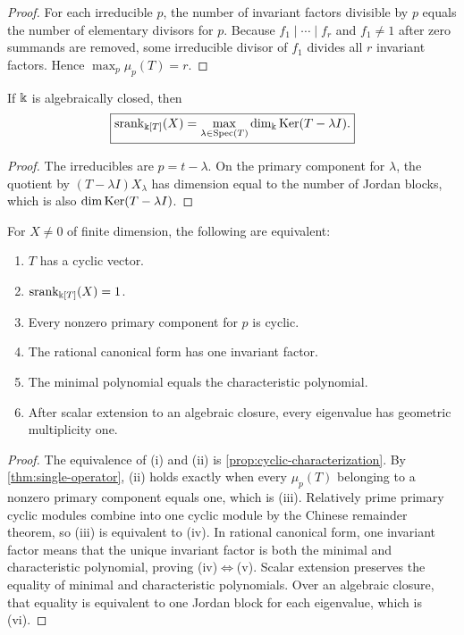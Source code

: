 \begin{proof}
For each irreducible $p$, the number of invariant factors divisible by $p$ equals the number of elementary divisors for $p$.  Because $f_1\mid\cdots\mid f_r$ and $f_1\neq1$ after zero summands are removed, some irreducible divisor of $f_1$ divides all $r$ invariant factors.  Hence $\max_p\mu_p(T)=r$.
\end{proof}

\begin{corollary}
\label{cor:geometric-multiplicity}
If $\Bbbk$ is algebraically closed, then
\[
\boxed{
\operatorname{srank}_{\Bbbk[T]}(X)
=
\max_{\lambda\in\operatorname{Spec}(T)}
\dim_{\Bbbk}\operatorname{Ker}(T-\lambda I).
}
\]
\end{corollary}

\begin{proof}
The irreducibles are $p=t-\lambda$.  On the primary component for $\lambda$, the quotient by $(T-\lambda I)X_\lambda$ has dimension equal to the number of Jordan blocks, which is also $\dim\operatorname{Ker}(T-\lambda I)$.
\end{proof}

\begin{corollary}
\label{cor:cyclic-matrix}
For $X\ne0$ of finite dimension, the following are equivalent:
\begin{enumerate}[label=(\roman*)]
\item $T$ has a cyclic vector.
\item $\operatorname{srank}_{\Bbbk[T]}(X)=1$.
\item Every nonzero primary component for $p$ is cyclic.
\item The rational canonical form has one invariant factor.
\item The minimal polynomial equals the characteristic polynomial.
\item After scalar extension to an algebraic closure, every eigenvalue has geometric multiplicity one.
\end{enumerate}
\end{corollary}

\begin{proof}
The equivalence of (i) and (ii) is \cref{prop:cyclic-characterization}.  By \cref{thm:single-operator}, (ii) holds exactly when every $\mu_p(T)$ belonging to a nonzero primary component equals one, which is (iii).  Relatively prime primary cyclic modules combine into one cyclic module by the Chinese remainder theorem, so (iii) is equivalent to (iv).  In rational canonical form, one invariant factor means that the unique invariant factor is both the minimal and characteristic polynomial, proving (iv)$\Leftrightarrow$(v).  Scalar extension preserves the equality of minimal and characteristic polynomials.  Over an algebraic closure, that equality is equivalent to one Jordan block for each eigenvalue, which is (vi).
\end{proof}

